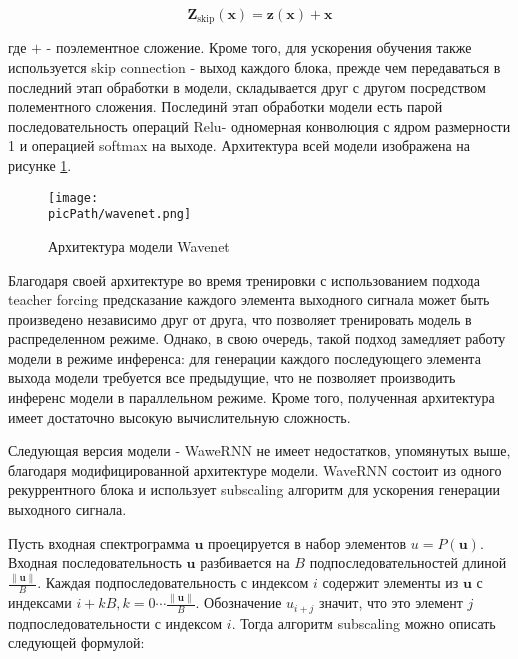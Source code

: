\documentclass[oneside,final,14pt]{extreport}
\newcommand{\picPath}{pictures}
\begin{document}
$$
\begin{equation}
\mathbf{Z}_{\text{skip}}(\mathbf{x})= \mathbf{z}(\mathbf{x}) + \mathbf{x}
\end{equation}
$$

 где $+$ - поэлементное сложение. Кроме того, для ускорения обучения также используется skip connection - выход каждого блока, прежде чем передаваться в последний этап обработки в модели, складывается друг с другом посредством полементного сложения. Послединй этап обработки модели есть парой последовательность операций Relu- одномерная конволюция с ядром размерности 1 и операцией softmax на выходе.  Архитектура всей модели изображена на рисунке \ref{pic:wavenet}.
 
 
 \begin{figure}[H]
\begin{center}
\texttt{[image: \\picPath/wavenet.png]}
\end{center}
  \caption{Архитектура модели Wavenet}
  \label{pic:wavenet}
  \end{figure}
  
  Благодаря своей архитектуре во время тренировки с использованием подхода teacher forcing \cite{bib:teacher_forcing} предсказание каждого элемента выходного сигнала может быть произведено независимо друг от друга, что позволяет тренировать модель в распределенном режиме\cite{bib:wavenet}. Однако, в свою очередь, такой подход замедляет работу модели в режиме инференса: для генерации каждого последующего элемента выхода модели требуется все предыдущие, что не позволяет производить инференс модели в параллельном режиме. Кроме того, полученная архитектура имеет достаточно высокую вычислительную сложность. 
  
  Следующая версия модели - WaweRNN \cite{bib:waveRNN} не имеет недостатков, упомянутых выше, благодаря модифицированной архитектуре модели. WaveRNN состоит из одного рекуррентного блока и использует subscaling алгоритм для ускорения генерации выходного сигнала.
  
Пусть входная спектрограмма $\mathbf{u}$ проецируется в набор элементов $u = P(\mathbf{u})$. Входная последовательность $\mathbf{u}$ разбивается на $B$ подпоследовательностей длиной $\frac{\|\mathbf{u}\|}{B}$. Каждая подпоследовательность с индексом $i$ содержит элементы из $\mathbf{u}$ с индексами $i + kB, k =0 \cdots \frac{\| \mathbf{u} \|}{B}$. Обозначение $u_{i + j}$ значит, что это элемент $j$ подпоследовательности с индексом $i$. Тогда алгоритм subscaling можно описать следующей формулой:
\end{document}
